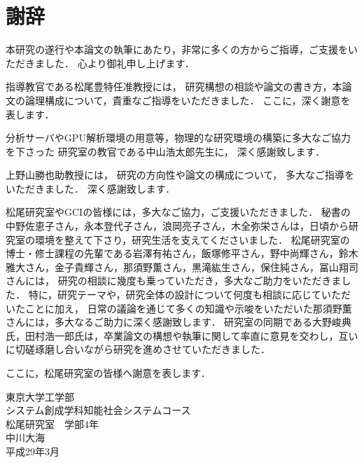 \chapter*{謝辞}
\fancyhf{}
\rhead{}
\lhead{}
\cfoot{\thepage}

本研究の遂行や本論文の執筆にあたり，非常に多くの方からご指導，ご支援をいただきました．
心より御礼申し上げます．

指導教官である松尾豊特任准教授には，
研究構想の相談や論文の書き方，本論文の論理構成について，貴重なご指導をいただきました．
ここに，深く謝意を表します．

分析サーバやGPU解析環境の用意等，物理的な研究環境の構築に多大なご協力を下さった
研究室の教官である中山浩太郎先生に，
深く感謝致します．

上野山勝也助教授には，
研究の方向性や論文の構成について，
多大なご指導をいただきました．
深く感謝致します．

松尾研究室やGCIの皆様には，多大なご協力，ご支援いただきました．
秘書の中野佐恵子さん，永本登代子さん，浪岡亮子さん，木全弥栄さんは，日頃から研究室の環境を整えて下さり，研究生活を支えてくださいました．
松尾研究室の博士・修士課程の先輩である岩澤有祐さん，飯塚修平さん，野中尚輝さん，鈴木雅大さん，金子貴輝さん，那須野薫さん，黒滝紘生さん，保住純さん，冨山翔司さんには，
研究の相談に幾度も乗っていただき，多大なご助力をいただきました．
特に，研究テーマや，研究全体の設計について何度も相談に応じていただいたことに加え，
日常の議論を通じて多くの知識や示唆をいただいた那須野薫さんには，多大なるご助力に深く感謝致します．
研究室の同期である大野峻典氏，田村浩一郎氏は，卒業論文の構想や執筆に関して率直に意見を交わし，互いに切磋琢磨し合いながら研究を進めさせていただきました．

ここに，松尾研究室の皆様へ謝意を表します．
\vvspace

\begin{flushright}
東京大学工学部\\
システム創成学科知能社会システムコース\\
松尾研究室　学部4年\\
中川大海\\
平成29年3月\\
\end{flushright}
